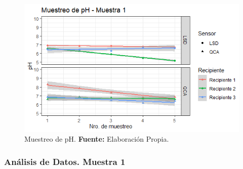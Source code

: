     \begin{figure}[H]
        \centering
        \includegraphics[width=0.75\linewidth]{Imagenes/cap4/pH_M1.png}
        \caption {Muestreo de pH. \textbf{Fuente:}
        Elaboraci\'on Propia. }
        \label{fig:M1PH}
    \end{figure}

\subsubsection{An\'alisis de Datos. Muestra 1}

